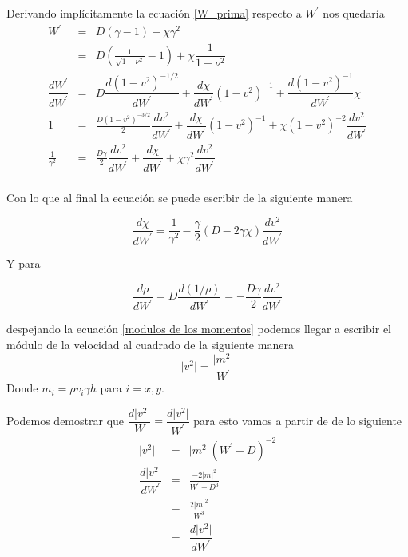 \documentclass[12pt,a4paper]{book}
\providecommand{\abs}[1]{\lvert#1\rvert} %
\begin{document}
Derivando implícitamente la ecuación \ref{W_prima} respecto a $W^{'}$ nos quedaría
\begin{eqnarray*}
W^{'}&=&D\left(\gamma-1 \right) + \chi \gamma^{2}\\%
&=& D\left(\frac{1}{\sqrt{1-\nu^{2}}} -1\right)+\chi \dfrac{1}{1-\nu^{2}} \\%
\dfrac{d W^{'}}{d W^{'}} &=& D \dfrac{d (1-v^2)^{-1/2}}{d W^{'}}+\dfrac{d \chi}{dW^{'}}(1-v^2)^{-1}+\dfrac{d (1-v^2)^{-1} }{d W^{'}}\chi \\  %
1 &=& \frac{D(1-v^2)^{-3/2}}{2} \dfrac{d v^{2}}{d W^{'}}+\dfrac{d \chi}{dW^{'}}(1-v^2)^{-1}+ \chi (1-v^2)^{-2}  \dfrac{d v^{2}}{d W^{'}} \\ %
\frac{1}{\gamma ^2} &=& \frac{D \gamma}{2} \dfrac{d v^{2}}{d W^{'}} + \dfrac{d \chi}{dW^{'}} + \chi \gamma^2 \dfrac{d v^2}{dW^{'}} \\ %
\end{eqnarray*}

Con lo que al final la ecuación se puede escribir de la siguiente manera

\begin{equation}\label{der_chi}
\dfrac{d \chi}{dW^{'}}=\frac{1}{\gamma^2}-\frac{\gamma}{2}(D-2\gamma \chi) \dfrac{d v^2}{dW^{'}}
\end{equation}

Y para

\begin{equation}\label{der_rho}
\dfrac{d \rho}{d W^{'}}= D \dfrac{d\left(1/ \rho \right) }{d W^{'}} = - \frac{D \gamma}{2}  \dfrac{d v^2}{dW^{'}}
\end{equation}

despejando la ecuación \ref{modulos de los momentos} podemos llegar a escribir el módulo de la velocidad al cuadrado de la siguiente manera
\begin{equation}
\abs{v^{2}} = \frac{\abs{m^{2}}}{W^{'}} 
\end{equation}
Donde $m_i= \rho v_i \gamma h$ para $i=x,y$.

Podemos demostrar que $\dfrac{d \abs{v^2}}{W}=\dfrac{d \abs{v^2}}{W^{'}}$ para esto vamos a partir de de lo siguiente 
\begin{eqnarray*}
\abs{v^2}&=& \abs{m^{2}} \left(W^{'} + D \right)^{-2} \\
\dfrac{d \abs{v^2}}{d W^{'}} &=& \frac{-2 \abs{m}^2}{W^{'}+D^{3}} \\
&=& \frac{2 \abs{m}^2}{W^{3}} \\
&=& \dfrac{d \abs{v^2}}{d W^{'}}
\end{eqnarray*}
\end{document}

